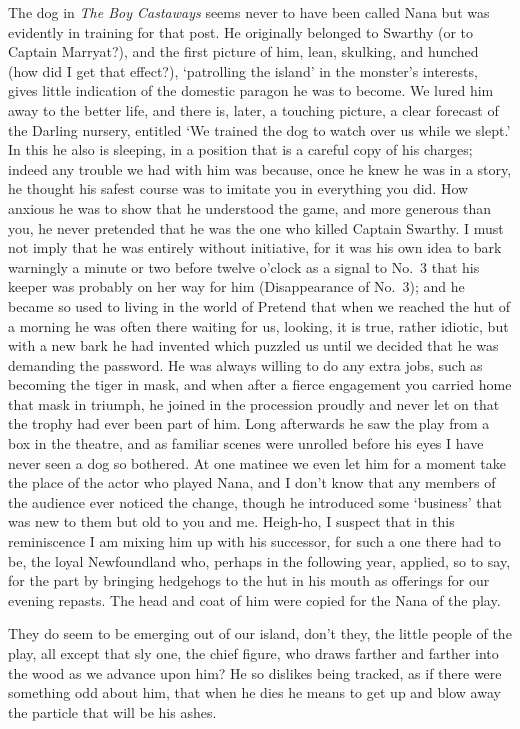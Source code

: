 The dog in \emph{The Boy Castaways} seems never to have been called Nana
but was evidently in training for that post.
He originally belonged to Swarthy (or to Captain Marryat?),
and the first picture of him, lean, skulking, and hunched (how did I get that effect?),
‘patrolling the island’ in the monster’s interests,
gives little indication of the domestic paragon he was to become.
We lured him away to the better life,
and there is, later, a touching picture, a clear forecast of the Darling nursery,
entitled ‘We trained the dog to watch over us while we slept.’
In this he also is sleeping, in a position that is a careful copy of his charges;
indeed any trouble we had with him was because, once he knew he was in a story,
he thought his safest course was to imitate you in everything you did.
How anxious he was to show that he understood the game,
and more generous than you, he never pretended that he was the one who killed Captain Swarthy.
I must not imply that he was entirely without initiative,
for it was his own idea to bark warningly a minute or two before twelve o’clock
as a signal to No.~3 that his keeper was probably on her way for him (Disappearance of No.~3);
and he became so used to living in the world of Pretend
that when we reached the hut of a morning he was often there waiting for us,
looking, it is true, rather idiotic,
but with a new bark he had invented which puzzled us
until we decided that he was demanding the password.
He was always willing to do any extra jobs, such as becoming the tiger in mask,
and when after a fierce engagement you carried home that mask in triumph,
he joined in the procession proudly and never let on that the trophy had ever been part of him.
Long afterwards he saw the play from a box in the theatre,
and as familiar scenes were unrolled before his eyes I have never seen a dog so bothered.
At one matinee we even let him for a moment take the place of the actor who played Nana,
and I don’t know that any members of the audience ever noticed the change,
though he introduced some ‘business’ that was new to them but old to you and me.
Heigh-ho, I suspect that in this reminiscence I am mixing him up with his successor,
for such a one there had to be,
the loyal Newfoundland who, perhaps in the following year, applied, so to say, for the part
by bringing hedgehogs to the hut in his mouth as offerings for our evening repasts.
The head and coat of him were copied for the Nana of the play.

They do seem to be emerging out of our island, don’t they,
the little people of the play,
all except that sly one, the chief figure,
who draws farther and farther into the wood as we advance upon him?
He so dislikes being tracked, as if there were something odd about him,
that when he dies he means to get up and blow away the particle that will be his ashes.

